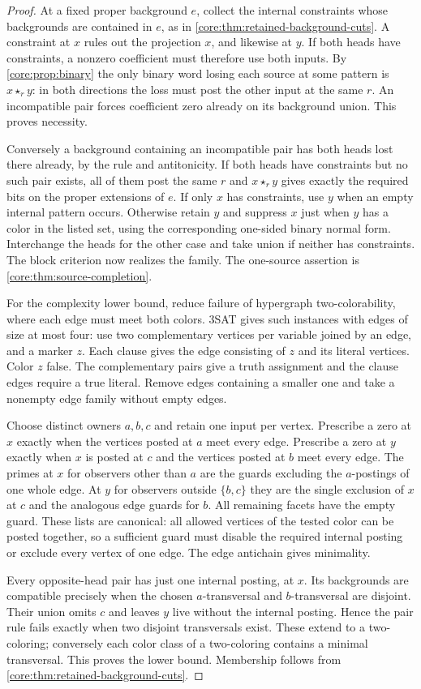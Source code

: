 \begin{proof}
At a fixed proper background $e$, collect the internal constraints
whose backgrounds are contained in $e$, as in
\cref{core:thm:retained-background-cuts}. A constraint at $x$ rules
out the projection $x$, and likewise at $y$. If both heads have
constraints, a nonzero coefficient must therefore use both inputs.
By \cref{core:prop:binary} the only binary word losing each source
at some pattern is $x\star_r y$: in both directions the loss must
post the other input at the same $r$. An incompatible pair forces
coefficient zero already on its background union. This proves
necessity.

Conversely a background containing an incompatible pair has both
heads lost there already, by the rule and antitonicity.
If both heads have constraints but no such pair exists, all of them
post the same $r$ and $x\star_r y$ gives exactly the required bits
on the proper extensions of $e$. If only $x$ has constraints, use
$y$ when an empty internal pattern occurs. Otherwise retain $y$
and suppress $x$ just when $y$ has a color in the listed set, using
the corresponding one-sided binary normal form. Interchange the
heads for the other case and take union if neither has constraints.
The block criterion now realizes the family. The one-source
assertion is \cref{core:thm:source-completion}.

For the complexity lower bound, reduce failure of hypergraph
two-colorability, where each edge must meet both colors. 3SAT gives
such instances with edges of size at most four: use two complementary
vertices per variable joined by an edge, and a marker $z$. Each
clause gives the edge consisting of $z$ and its literal vertices.
Color $z$ false. The complementary pairs give a truth assignment
and the clause edges require a true literal. Remove edges containing
a smaller one and take a nonempty edge family without empty edges.

Choose distinct owners $a,b,c$ and retain one input per vertex.
Prescribe a zero at $x$ exactly when the vertices posted at $a$ meet
every edge. Prescribe a zero at $y$ exactly when $x$ is posted at
$c$ and the vertices posted at $b$ meet every edge. The primes at
$x$ for observers other than $a$ are the guards excluding the
$a$-postings of one whole edge. At $y$ for observers outside
$\{b,c\}$ they are the single exclusion of $x$ at $c$ and the
analogous edge guards for $b$. All remaining facets have the
empty guard. These lists are canonical: all allowed vertices of the
tested color can be posted together, so a sufficient guard must
disable the required internal posting or exclude every vertex of
one edge. The edge antichain gives minimality.

Every opposite-head pair has just one internal posting, at $x$.
Its backgrounds are compatible precisely when the chosen
$a$-transversal and $b$-transversal are disjoint. Their union omits
$c$ and leaves $y$ live without the internal posting. Hence the
pair rule fails exactly when two disjoint transversals exist.
These extend to a two-coloring; conversely each color class of a
two-coloring contains a minimal transversal. This proves the
lower bound. Membership follows from
\cref{core:thm:retained-background-cuts}.
\end{proof}

